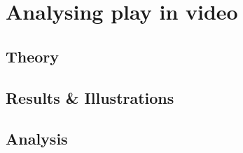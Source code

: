 \section{Analysing play in video}
\subsection{Theory}
\subsection{Results \& Illustrations}
\subsection{Analysis}